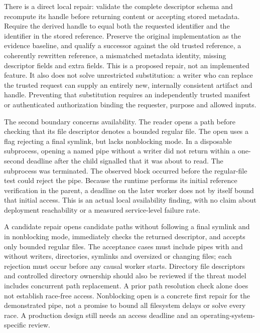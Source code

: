 There is a direct local repair: validate the complete descriptor schema
and recompute its handle before returning content or accepting stored
metadata. Require the derived handle to equal both the requested
identifier and the identifier in the stored reference. Preserve the
original implementation as the evidence baseline, and qualify a
successor against the old trusted reference, a coherently rewritten
reference, a mismatched metadata identity, missing descriptor fields and
extra fields. This is a proposed repair, not an implemented feature. It
also does not solve unrestricted substitution: a writer who can replace
the trusted request can supply an entirely new, internally consistent
artifact and handle. Preventing that substitution requires an
independently trusted manifest or authenticated authorization binding
the requester, purpose and allowed inputs. \citep{exec14_custody_design}

The second boundary concerns availability. The reader opens a path
before checking that its file descriptor denotes a bounded regular file.
The open uses a flag rejecting a final symlink, but lacks nonblocking
mode. In a disposable subprocess, opening a named pipe without a writer
did not return within a one-second deadline after the child signalled
that it was about to read. The subprocess was terminated. The observed
block occurred before the regular-file test could reject the pipe.
Because the runtime performs its initial reference verification in the
parent, a deadline on the later worker does not by itself bound that
initial access. This is an actual local availability finding, with no
claim about deployment reachability or a measured service-level failure
rate. \citep{exec14_custody_implementation,exec14_custody_observations}

A candidate repair opens candidate paths without following a final
symlink and in nonblocking mode, immediately checks the returned
descriptor, and accepts only bounded regular files. The acceptance cases
must include pipes with and without writers, directories, symlinks and
oversized or changing files; each rejection must occur before any causal
worker starts. Directory file descriptors and controlled directory
ownership should also be reviewed if the threat model includes
concurrent path replacement. A prior path resolution check alone does
not establish race-free access. Nonblocking open is a concrete first
repair for the demonstrated pipe, not a promise to bound all filesystem
delays or solve every race. A production design still needs an access
deadline and an operating-system-specific review.
\citep{exec14_custody_design}

